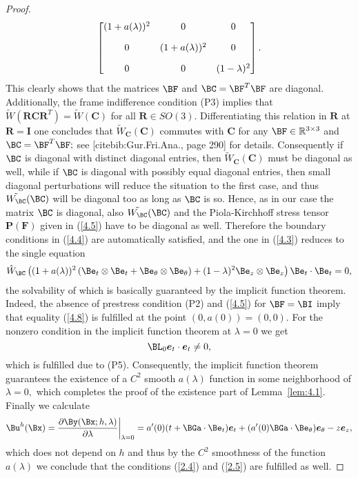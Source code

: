 \begin{proof}
\begin{equation}
\begin{bmatrix}
(1+a(\lambda))^2 & 0 &0 \\[10pt]
 0 & (1+a(\lambda))^2  & 0 \\[10pt]
 0 & 0 & (1-\lambda)^2
\end{bmatrix}.
\end{equation}
This clearly shows that the matrices $\BF$ and $\BC=\BF^T \BF$ are diagonal. Additionally, the frame indifference condition (P3) implies that $\tilde{W}\left(\bm R \bm C \bm R^T\right)=\tilde W(\bm C)$ for all $\bm R \in S O(3)$. Differentiating this relation in $\bm R$ at $\boldsymbol{R}=\boldsymbol{I}$ one concludes that 
$\tilde{W}_{\boldsymbol{C}}(\boldsymbol{C})$ commutes with $\boldsymbol{C}$ for any $\BF\in\mathbb R^{3\times 3}$ and $\BC=\BF^T \BF;$ see [cite{bib:Gur.Fri.Ana.}, page 290] for details. Consequently if $\BC$ is diagonal with distinct diagonal entries, then $\tilde{W}_{\boldsymbol{C}}(\boldsymbol{C})$ must be diagonal as well, while if $\BC$ is diagonal with possibly equal diagonal entries, then small diagonal perturbations will reduce the situation to the first case, and thus  
$\tilde{W_\BC}(\BC)$ will be diagonal too as long as $\BC$ is so. Hence, as in our case the matrix $\BC$ is diagonal, also $\tilde{W_\BC}(\BC)$ and the Piola-Kirchhoff stress tensor $\bm P(\bm F)$ given in (\ref{4.5}) have to be diagonal as well. 
Therefore the boundary conditions in (\ref{4.4}) are automatically satisfied, and the one in (\ref{4.3}) reduces to the single equation
\begin{equation}
\label{4.8}
\hat{W}_{\BC}\left((1+a(\lambda))^{2}\left(\Be_{t} \otimes \Be_{t}+\Be_{\theta} \otimes \Be_{\theta}\right)+(1-\lambda)^{2} \Be_{z} \otimes \Be_{z}\right)
 \Be_{t} \cdot \Be_{t}=0, 
\end{equation}
the solvability of which is basically guaranteed by the implicit function theorem. Indeed, the absence of prestress condition (P2) and (\ref{4.5}) for $\BF=\BI$ imply that equality (\ref{4.8}) is fulfilled at the point $(0,a(0))=(0,0).$ For the nonzero condition in the implicit function theorem at $\lambda=0$ we get 
$$\BL_0\bm e_t\cdot \bm e_t\neq 0,$$
which is fulfilled due to (P5). Consequently, the implicit function theorem guarantees the existence of a $C^2$ smooth $a(\lambda)$ function in some neighborhood of 
$\lambda=0,$ which completes the proof of the existence part of Lemma~\ref{lem:4.1}. Finally we calculate
$$\Bu^h(\Bx)=\frac{\partial \By(\Bx;h,\lambda)}{\partial \lambda}\bigg\vert_{\lambda=0}=
a'(0)(t+\BGa\cdot\Be_t)\bm e_t+(a'(0)\BGa\cdot\Be_\Gth) \bm e_\Gth-z\bm e_z,$$
which does not depend on $h$ and thus by the $C^2$ smoothness of the function $a(\lambda)$ we conclude that the conditions (\ref{2.4}) and (\ref{2.5})
are fulfilled as well. 

\end{proof}

